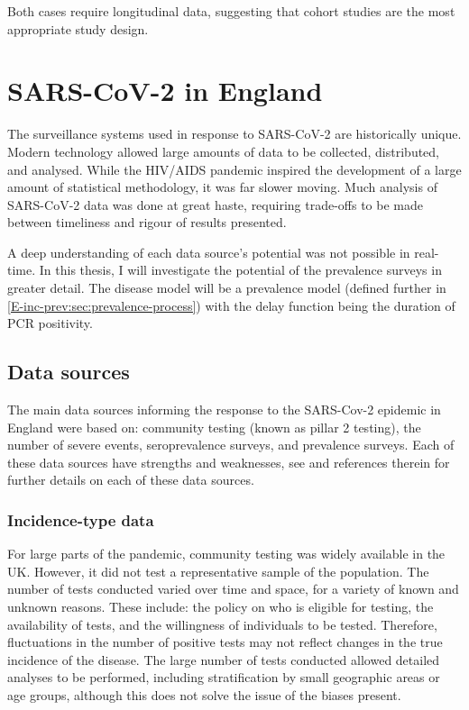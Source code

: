 \documentclass[thesis.tex]{subfiles}
\begin{document}
Both cases require longitudinal data, suggesting that cohort studies are the most appropriate study design.

\section{SARS-CoV-2 in England}

The surveillance systems used in response to SARS-CoV-2 are historically unique.
Modern technology allowed large amounts of data to be collected, distributed, and analysed.
While the HIV/AIDS pandemic inspired the development of a large amount of statistical methodology, it was far slower moving.
Much analysis of SARS-CoV-2 data was done at great haste, requiring trade-offs to be made between timeliness and rigour of results presented.

A deep understanding of each data source's potential was not possible in real-time.
In this thesis, I will investigate the potential of the prevalence surveys in greater detail.
The disease model will be a prevalence model (defined further in \cref{E-inc-prev:sec:prevalence-process}) with the delay function being the duration of PCR positivity.

\subsection{Data sources} \label{intro:sec:data-for-estimating}

The main data sources informing the response to the SARS-Cov-2 epidemic in England were based on: community testing (known as pillar 2 testing), the number of severe events, seroprevalence surveys, and prevalence surveys.
Each of these data sources have strengths and weaknesses, see \textcite{royalSocietyRnumber} and references therein for further details on each of these data sources.

\subsubsection{Incidence-type data}

For large parts of the pandemic, community testing was widely available in the UK.
However, it did not test a representative sample of the population.
The number of tests conducted varied over time and space, for a variety of known and unknown reasons.
These include: the policy on who is eligible for testing, the availability of tests, and the willingness of individuals to be tested.
Therefore, fluctuations in the number of positive tests may not reflect changes in the true incidence of the disease.
The large number of tests conducted allowed detailed analyses to be performed, including stratification by small geographic areas or age groups, although this does not solve the issue of the biases present.
\end{document}
